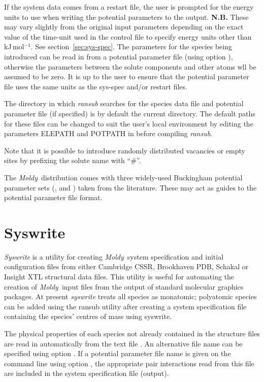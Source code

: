\documentclass[a4paper,twoside]{report}
\newcommand{\moldy}{\emph{Moldy}}
\begin{document}
If the system data comes from a restart file, the user is prompted for
the energy units to use when writing the potential parameters to the
output. \textbf{N.B.} These may vary slightly from the original
input parameters depending on the exact value of the time-unit used
in the control file to specify energy units other than kJ\,mol$^{-1}$. See
section~\ref{sec:sys-spec}. The parameters for the species being introduced
can be read in from a potential parameter file (using option ),
otherwise the parameters between the solute components and
other atoms wll be assumed to be zero. It is up to the user to ensure that
the potential parameter file uses the same units as the sys-spec and/or restart
files.

The directory in which \emph{ransub} searches for the species data
file and potential parameter file (if specified) is by default the current
directory. The default paths for these
files can be changed to suit the user's local environment by editing the
parameters ELEPATH and POTPATH in  before compiling
\emph{ransub}.

Note that it is possible to introduce
randomly distributed vacancies or empty sites by prefixing the solute name with ``\#''.

The \moldy\ distribution comes with three widely-used Buckingham potential
parameter sets (,  and
) taken from the literature. These may act as guides
to the potential parameter file format.

\section{Syswrite}%
\emph{Syswrite} is a utility for creating \moldy\ system specification
and initial configuration files from either Cambridge CSSR, Brookhaven
PDB, Schakal or Insight XTL structural data files. This utility
is useful for automating the creation of \moldy\ input files from the output
of standard molecular graphics packages.
 At present \emph{syswrite} treats all species
as monatomic; polyatomic species can be added using the ransub utility after
creating a system specification file containing the species' centres of mass
using syswrite.

The physical properties of each species not already contained in the
structure files are read in automatically from the text file
. An alternative
file name can be specified using option . If a potential
parameter file name is given on the command line using option
, the appropriate pair interactions read from this file are
included in the system specification file (output).
\end{document}
